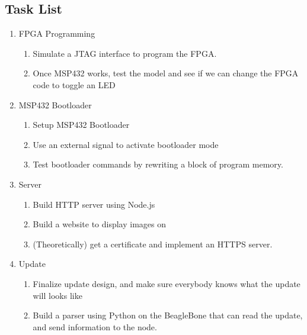 \documentclass[11pt]{article}
\begin{document}
\subsection{Task List}

\begin{enumerate}
    \item FPGA Programming 
    \begin{enumerate}
        \item Simulate a JTAG interface to program the FPGA.
        \item Once MSP432 works, test the model and see if we can change the FPGA code to toggle an LED
    \end{enumerate}
    \item MSP432 Bootloader
    \begin{enumerate}
        \item Setup MSP432 Bootloader
        \item Use an external signal to activate bootloader mode 
        \item Test bootloader commands by rewriting a block of program memory. 
    \end{enumerate}
    
    \item Server
    \begin{enumerate}
        \item Build HTTP server using Node.js
        \item Build a website to display images on
        \item (Theoretically) get a certificate and implement an HTTPS server. 
    \end{enumerate}
    \item Update
    \begin{enumerate}
        \item Finalize update design, and make sure everybody knows what the update will looks like
        \item Build a parser using Python on the BeagleBone that can read the update, and send information to the node. 
    \end{enumerate}
\end{enumerate}


\end{document}
